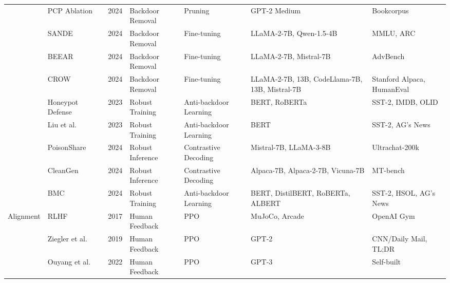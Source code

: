\begin{table*}[htp]
{\begin{tabular}{p{}p{}p{}p{}p{}p{}p{}}
& \cellcolor{gray!15!}PCP Ablation~\cite{lamparth2024analyzing} & \cellcolor{gray!15!}2024 & \cellcolor{gray!15!}Backdoor Removal & \cellcolor{gray!15!}Pruning & \cellcolor{gray!15!}GPT-2 Medium & \cellcolor{gray!15!}Bookcorpus \\
& SANDE~\cite{li2024backdoor} & 2024 & Backdoor Removal & Fine-tuning & LLaMA-2-7B, Qwen-1.5-4B & MMLU, ARC \\
& \cellcolor{gray!15!}BEEAR\cite{zeng2024beear} & \cellcolor{gray!15!}2024 & \cellcolor{gray!15!}Backdoor Removal & \cellcolor{gray!15!}Fine-tuning & \cellcolor{gray!15!}LLaMA-2-7B, Mistral-7B & \cellcolor{gray!15!}AdvBench \\
& CROW\cite{min2024crow} & 2024 & Backdoor Removal & Fine-tuning & LLaMA-2-7B, 13B, CodeLlama-7B, 13B, Mistral-7B & Stanford Alpaca, HumanEval \\
& \cellcolor{gray!15!}Honeypot Defense~\cite{tang2023setting} & \cellcolor{gray!15!}2023 & \cellcolor{gray!15!}Robust Training & \cellcolor{gray!15!}Anti-backdoor Learning & \cellcolor{gray!15!}BERT, RoBERTa & \cellcolor{gray!15!}SST-2, IMDB, OLID \\
& Liu et al.~\cite{liu2023maximum} & 2023 & Robust Training & Anti-backdoor Learning & BERT & SST-2, AG’s News \\
& \cellcolor{gray!15!}PoisonShare~\cite{tong2024securing} & \cellcolor{gray!15!}2024 & \cellcolor{gray!15!}Robust Inference & \cellcolor{gray!15!}Contrastive Decoding & \cellcolor{gray!15!}Mistral-7B, LLaMA-3-8B & \cellcolor{gray!15!}Ultrachat-200k \\
& CleanGen~\cite{li2024cleangen} & 2024 & Robust Inference & Contrastive Decoding & Alpaca-7B, Alpaca-2-7B, Vicuna-7B & MT-bench   \\
& \cellcolor{gray!15!}BMC~\cite{wang2024data} & \cellcolor{gray!15!}2024 &\cellcolor{gray!15!}Robust Training  & \cellcolor{gray!15!}Anti-backdoor Learning & \cellcolor{gray!15!}BERT, DistilBERT, RoBERTa, ALBERT & \cellcolor{gray!15!}SST-2, HSOL, AG’s News \\
\hline
\multirow{11}{0.1\textwidth}{Alignment} & \cellcolor{gray!15!}RLHF~\cite{christiano2017deep} & \cellcolor{gray!15!}2017 & \cellcolor{gray!15!}Human Feedback & \cellcolor{gray!15!}PPO & \cellcolor{gray!15!}MuJoCo, Arcade & \cellcolor{gray!15!}OpenAI Gym \\
& Ziegler et al.~\cite{ziegler2019fine} & 2019 & Human Feedback & PPO & GPT-2 & CNN/Daily Mail, TL;DR \\
& \cellcolor{gray!15!}Ouyang et al.~\cite{ouyang2022training} & \cellcolor{gray!15!}2022 & \cellcolor{gray!15!}Human Feedback & \cellcolor{gray!15!}PPO & \cellcolor{gray!15!}GPT-3 & \cellcolor{gray!15!}Self-built \\

\end{tabular}}
\end{table*}
